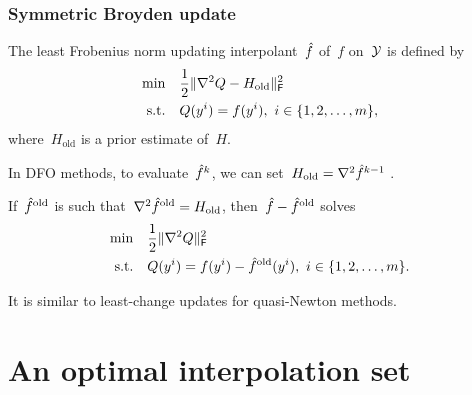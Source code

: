 \documentclass{polyu-presentation}
\newcommand{\obj}{f}
\newcommand{\objm}[1][]{\hat{f}\ifthenelse{\equal{#1}{}}{}{^{#1}}}
\newcommand{\xpt}[1][]{\mathcal{Y}\ifthenelse{\equal{#1}{}}{}{^{#1}}}
\begin{document}
\begin{frame}
    \frametitle{Symmetric Broyden update}

    The \alert{least Frobenius norm updating} interpolant~$\objm$ of~$\obj$ on~$\xpt$ is defined by
    \begin{align*}
        \min        & \quad \frac{1}{2} \norm{\nabla^2 Q - H_{\text{old}}}_{\mathsf{F}}^2    \\
        \text{s.t.} & \quad Q(y^i) = \obj(y^i), ~ i \in \set{1, 2, \dots, m},
    \end{align*}
    where~$H_{\text{old}}$ is a \alert{prior estimate} of~$H$.

    \begin{block}{}
        In \alert{DFO methods}, to evaluate~$\objm[k]$, we can set~$H_{\text{old}} = \nabla^2 \objm[k - 1]$ \parencite{Powell_2004b}.
    \end{block}

    If~$\objm[\text{old}]$ is such that~$\nabla^2 \objm[\text{old}] = H_{\text{old}}$, then~$\objm - \objm[\text{old}]$ solves
    \begin{align*}
        \min        & \quad \frac{1}{2} \norm{\nabla^2 Q}_{\mathsf{F}}^2    \\
        \text{s.t.} & \quad Q(y^i) = \obj(y^i) - \objm[\text{old}](y^i), ~ i \in \set{1, 2, \dots, m}.
    \end{align*}

    It is similar to least-change updates for quasi-Newton methods.
\end{frame}

\section{An optimal interpolation set}
\end{document}
